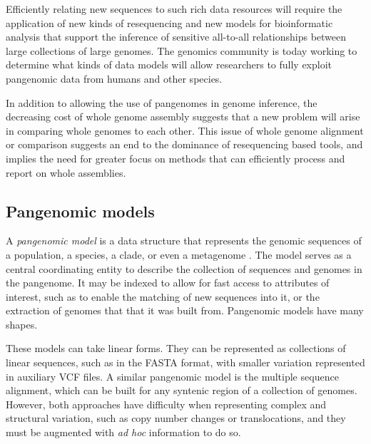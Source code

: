 Efficiently relating new sequences to such rich data resources will require the application of new kinds of resequencing and new models for bioinformatic analysis that support the inference of sensitive all-to-all relationships between large collections of large genomes.
The genomics community is today working to determine what kinds of data models will allow researchers to fully exploit pangenomic data from humans and other species.

In addition to allowing the use of pangenomes in genome inference, the decreasing cost of whole genome assembly suggests that a new problem will arise in comparing whole genomes to each other.
This issue of whole genome alignment or comparison suggests an end to the dominance of resequencing based tools, and implies the need for greater focus on methods that can efficiently process and report on whole assemblies.


\subsection{Pangenomic models}

A \emph{pangenomic model} is a data structure that represents the genomic sequences of a population, a species, a clade, or even a metagenome \cite{computational2016computational}.
The model serves as a central coordinating entity to describe the collection of sequences and genomes in the pangenome.
It may be indexed to allow for fast access to attributes of interest, such as to enable the matching of new sequences into it, or the extraction of genomes that that it was built from.
Pangenomic models have many shapes.

These models can take linear forms.
They can be represented as collections of linear sequences, such as in the FASTA format, with smaller variation represented in auxiliary VCF files.
A similar pangenomic model is the multiple sequence alignment, which can be built for any syntenic region of a collection of genomes.
However, both approaches have difficulty when representing complex and structural variation, such as copy number changes or translocations, and they must be augmented with \textit{ad hoc} information to do so.

